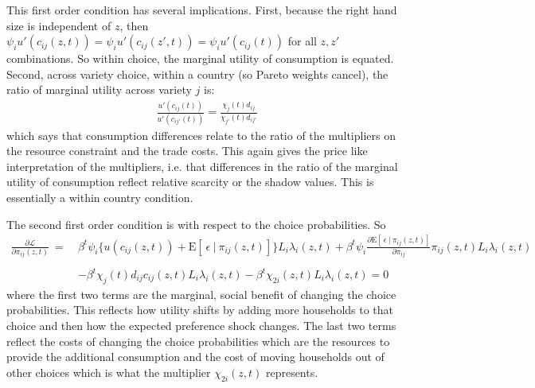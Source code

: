 \documentclass[12pt,pdftex]{article}
\begin{document}
\begin{onehalfspacing}
This first order condition has several implications. First, because the right hand size is independent of $z$, then $\psi_{i} u'(c_{ij}(z, t)) = \psi_{i} u'(c_{ij}(z', t)) = \psi_{i} u'(c_{ij}(t))$ for all $z, z'$ combinations. So within choice, the marginal utility of consumption is equated. Second, across variety choice, within a country (so Pareto weights cancel), the ratio of marginal utility across variety $j$ is:
\begin{align}
\frac{u'(c_{ij}(t))}{u'(c_{ij'}(t))} = \frac{\chi_{j}(t) d_{ij}}{\chi_{j'}(t) d_{ij'}}
\end{align}
which says that consumption differences relate to the ratio of the multipliers on the resource constraint and the trade costs. This again gives the price like interpretation of the multipliers, i.e. that differences in the ratio of the marginal utility of consumption reflect relative scarcity or the shadow values. This is essentially a within country \citet{backus1993} condition.

The second first order condition is with respect to the choice probabilities. So
\begin{align}
\frac{\partial \mathcal{L} }{\partial \pi_{ij}(z, t)} \ = \ & \beta^{t} \psi_{i} \bigg \{  u(c_{ij}(z, t) ) + \mathrm{E}[ \ \epsilon \ | \ \pi_{ij}(z,t) ] \bigg \} L_{i} \lambda_{i}(z, t) + \beta^{t}\psi_{i} \frac{\partial \mathrm{E}[ \ \epsilon \ | \ \pi_{ij}(z,t) ]}{\partial \pi_{ij}}\pi_{ij}(z,t) L_{i} \lambda_{i}(z, t) \nonumber \\
\nonumber \\
& - \beta^{t} \chi_{j}(t) d_{ij} c_{ij}(z, t) L_{i}\lambda_{i}(z, t) - \beta^{t} \chi_{2i}(z,t) L_{i} \lambda_{i}(z, t)  = 0
\end{align}
where the first two terms are the marginal, social benefit of changing the choice probabilities. This reflects how utility shifts by adding more households to that choice and then how the expected preference shock changes. The last two terms reflect the costs of changing the choice probabilities which are the resources to provide the additional consumption and the cost of moving households out of other choices which is what the multiplier $\chi_{2i}(z,t)$ represents.


\end{onehalfspacing}
\end{document}
